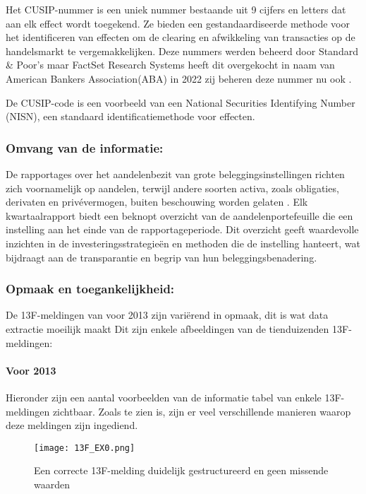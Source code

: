 Het CUSIP-nummer is een uniek nummer bestaande uit 9 cijfers en letters dat aan elk effect wordt toegekend. Ze bieden een gestandaardiseerde methode voor het identificeren van effecten om de clearing en afwikkeling van transacties op de handelsmarkt te vergemakkelijken. Deze nummers werden beheerd door Standard \& Poor's maar FactSet Research Systems heeft dit overgekocht in naam van American Bankers Association(ABA) in 2022 zij beheren deze nummer nu ook \autocite{Hayes_2024}.

De CUSIP-code is een voorbeeld van een National Securities Identifying Number (NISN), een standaard identificatiemethode voor effecten.

\subsubsection{Omvang van de informatie:}

De rapportages over het aandelenbezit van grote beleggingsinstellingen richten zich voornamelijk op aandelen, terwijl andere soorten activa, zoals obligaties, derivaten en privévermogen, buiten beschouwing worden gelaten \autocite{SECform13F2024}. Elk kwartaalrapport biedt een beknopt overzicht van de aandelenportefeuille die een instelling aan het einde van de rapportageperiode. Dit overzicht geeft waardevolle inzichten in de investeringsstrategieën en methoden die de instelling hanteert, wat bijdraagt aan de transparantie en begrip van hun beleggingsbenadering.


\subsubsection{Opmaak en toegankelijkheid:}
De 13F-meldingen van voor 2013 zijn variërend in opmaak, dit is wat data extractie moeilijk maakt
Dit zijn enkele afbeeldingen van de tienduizenden 13F-meldingen:

\paragraph{Voor 2013}
Hieronder zijn een aantal voorbeelden van de informatie tabel van enkele 13F-meldingen zichtbaar. Zoals te zien is, zijn er veel verschillende manieren waarop deze meldingen zijn ingediend.

\begin{figure}[hbt!]
    \texttt{[image: 13F\_EX0.png]}
    \caption[13F voorbeeld 1]{\label{fig:voorbeeld 1}Een correcte 13F-melding duidelijk gestructureerd en geen missende waarden}
\end{figure}


